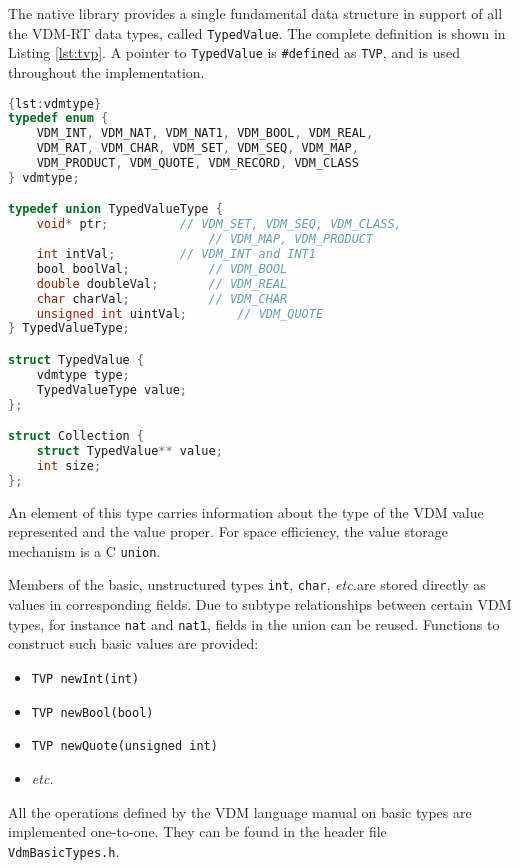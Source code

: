 The native library provides a single fundamental data structure in support of all the VDM-RT data types, called \texttt{TypedValue}.
%
The complete definition is shown in Listing \ref{lst:tvp}.
%
A pointer to \texttt{TypedValue} is \texttt{\#define}d as \texttt{TVP}, and is used throughout the implementation.
%
%
%
\begin{lstlisting}[language=C,caption={Fundamental code generator data type.},label={lst:tvp},frame=tlbr]{lst:vdmtype}
typedef enum {
	VDM_INT, VDM_NAT, VDM_NAT1, VDM_BOOL, VDM_REAL, 
	VDM_RAT, VDM_CHAR, VDM_SET, VDM_SEQ, VDM_MAP,
	VDM_PRODUCT, VDM_QUOTE, VDM_RECORD, VDM_CLASS
} vdmtype;

typedef union TypedValueType {
	void* ptr;			// VDM_SET, VDM_SEQ, VDM_CLASS,
	            			// VDM_MAP, VDM_PRODUCT
	int intVal;			// VDM_INT and INT1
	bool boolVal;			// VDM_BOOL
	double doubleVal;		// VDM_REAL
	char charVal;			// VDM_CHAR
	unsigned int uintVal;		// VDM_QUOTE
} TypedValueType;

struct TypedValue {
	vdmtype type;
	TypedValueType value;
};

struct Collection {
	struct TypedValue** value;
	int size;
};
\end{lstlisting}
%
%
%
An element of this type carries information about the type of the VDM value represented and the value proper.
%
For space efficiency, the value storage mechanism is a C \texttt{union}.

Members of the basic, unstructured types \texttt{int}, \texttt{char}, \emph{etc.}\@ are stored directly as values in corresponding fields.
%
Due to subtype relationships between certain VDM types, for instance \texttt{nat} and \texttt{nat1}, fields in the union can be reused.
%
Functions to construct such basic values are provided:
%
%
%
\begin{itemize}
\item \texttt{TVP newInt(int)}
\item \texttt{TVP newBool(bool)}
\item \texttt{TVP newQuote(unsigned int)}
\item \emph{etc.\@}
\end{itemize}
%
%
%
All the operations defined by the VDM language manual on basic types are implemented one-to-one.
%
They can be found in the header file\\\texttt{VdmBasicTypes.h}.

